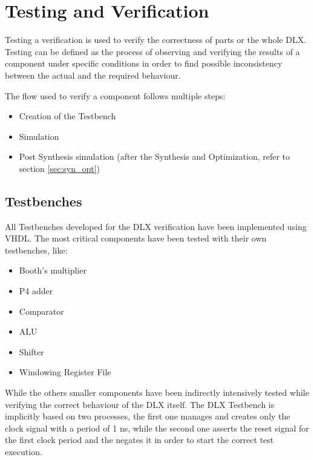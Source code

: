 \chapter{Testing and Verification}
Testing a verification is used to verify the correctness of parts or the whole DLX. Testing can be defined as the process of observing and verifying the results of a component under specific conditions in order to find possible inconsistency between the actual and the required behaviour.

The flow used to verify a component follows multiple steps:
\begin{itemize}
	\itemsep0sp
	\item Creation of the Testbench
	\item Simulation
	\item Post Synthesis simulation (after the Synthesis and Optimization, refer to section \ref{sec:syn_opt})
\end{itemize}

\section{Testbenches}
All Testbenches developed for the DLX verification have been implemented using VHDL. The most critical components have been tested with their own testbenches, like:
\begin{itemize}
	\itemsep0sp
	\item Booth's multiplier
	\item P4 adder
	\item Comparator
	\item ALU
	\item Shifter
	\item Windowing Register File
\end{itemize}
While the others smaller components have been indirectly intensively tested while verifying the correct behaviour of the DLX itself.\newline\newline
The DLX Testbench is implicitly based on two processes, the first one manages and creates only the clock signal with a period of 1 ns, while the second one asserts the reset signal for the first clock period and the negates it in order to start the correct test execution.

